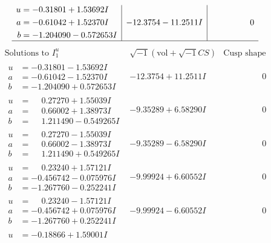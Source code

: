 \documentclass[1p]{elsarticle_modified}
\theoremstyle{definition}
\newcommand{\I}{\sqrt{-1}}
\begin{document}
$$\begin{array}{c|c|c}
\begin{aligned}
u &= -0.31801 + 1.53692 I \\
a &= -0.61042 + 1.52370 I \\
b &= -1.204090 - 0.572653 I\end{aligned}
 & -12.3754 - 11.2511 I & \phantom{-0.000000 } 0\\
 \hline 
 \end{array}$$\newpage$$\begin{array}{c|c|c}  
\text{Solutions to }I^u_{1}& \I (\text{vol} + \sqrt{-1}CS) & \text{Cusp shape}\\
 \hline 
\begin{aligned}
u &= -0.31801 - 1.53692 I \\
a &= -0.61042 - 1.52370 I \\
b &= -1.204090 + 0.572653 I\end{aligned}
 & -12.3754 + 11.2511 I & \phantom{-0.000000 } 0 \\ \hline\begin{aligned}
u &= \phantom{-}0.27270 + 1.55039 I \\
a &= \phantom{-}0.66002 + 1.38973 I \\
b &= \phantom{-}1.211490 - 0.549265 I\end{aligned}
 & -9.35289 + 6.58290 I & \phantom{-0.000000 } 0 \\ \hline\begin{aligned}
u &= \phantom{-}0.27270 - 1.55039 I \\
a &= \phantom{-}0.66002 - 1.38973 I \\
b &= \phantom{-}1.211490 + 0.549265 I\end{aligned}
 & -9.35289 - 6.58290 I & \phantom{-0.000000 } 0 \\ \hline\begin{aligned}
u &= \phantom{-}0.23240 + 1.57121 I \\
a &= -0.456742 - 0.075976 I \\
b &= -1.267760 - 0.252241 I\end{aligned}
 & -9.99924 + 6.60552 I & \phantom{-0.000000 } 0 \\ \hline\begin{aligned}
u &= \phantom{-}0.23240 - 1.57121 I \\
a &= -0.456742 + 0.075976 I \\
b &= -1.267760 + 0.252241 I\end{aligned}
 & -9.99924 - 6.60552 I & \phantom{-0.000000 } 0 \\ \hline\begin{aligned}
u &= -0.18866 + 1.59001 I \\

\end{aligned}
\end{array}$$
\end{document}
